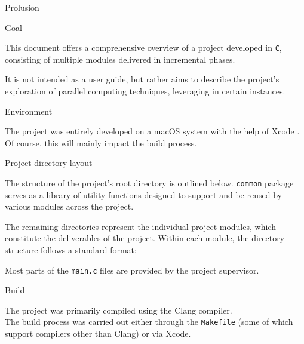 \begin{chapter}{Prolusion}
	\begin{section}{Goal}
		\par This document offers a comprehensive overview of a project developed in \texttt{C}, consisting of multiple modules delivered in incremental phases.
		\par It is not intended as a user guide, but rather aims to describe the project’s exploration of parallel computing techniques, leveraging  in certain instances.
	\end{section}
	\begin{section}{Environment}
		\par The project was entirely developed on a macOS system with the help of Xcode .\\
		Of course, this will mainly impact the build process.
	\end{section}
	\clearpage
	\begin{section}{Project directory layout}
		\par The structure of the project’s root directory is outlined below.
		\medskip
		\medskip
		\texttt{common} package serves as a library of utility functions designed to support and be reused by various modules across the project.
		\vspace{\baselineskip}
		\par The remaining directories represent the individual project modules, which constitute the deliverables of the project. Within each module, the directory structure follows a standard format:
		\medskip
		\medskip
		\par Most parts of the \texttt{main.c} files are provided by the project supervisor.
	\end{section}
	\clearpage
	\begin{section}{Build}
		\par The project was primarily compiled using the Clang compiler.\\
		The build process was carried out either through the \texttt{Makefile} (some of which support compilers other than Clang) or via Xcode.

\end{section}
\end{chapter}
